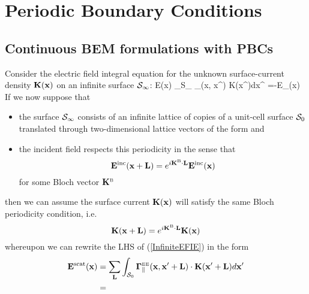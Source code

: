 \documentclass[letterpaper]{article}
\newcommand{\KB}{\vb K\supt{B}}
\begin{document}
\newpage
\section{Periodic Boundary Conditions}

\subsection{Continuous BEM formulations with PBCs}

Consider the electric field integral equation for
the unknown surface-current density $\mathbf{K}(\mathbf{x})$ on 
an infinite surface $\mathcal{S}_\infty$:
{
  \vb E(\vb x)\equiv 
  \int_{\mc S_\infty} 
   \BG_{\parallel}(\vb x, \vb x^\prime) 
   \cdot 
   \vb K(\vb x^\prime)d\vb x^\prime
  =-\vb E_{\parallel}(\vb x)
}
If we now suppose that 
\begin{itemize}
 \item the surface $\mathcal{S}_\infty$ consists of an infinite lattice
       of copies of a unit-cell surface $\mathcal{S}_0$ translated through
       two-dimensional lattice vectors of the form 
       and
 \item the incident field respects this periodicity in the sense that 
       $$ \vb E\sups{inc}(\vb x+\vb L)
          = e^{i\KB \cdot \vb L} \vb E\sups{inc}(\vb x)
       $$
       for some Bloch vector $\KB$
\end{itemize}
then we can assume the surface current $\mathbf{K}(\mathbf{x})$ will satisfy
the same Bloch periodicity condition, i.e.
$$ \vb K(\vb x+\vb L)
   = e^{i\KB \cdot \vb L} \vb K(\vb x)
$$
whereupon we can rewrite the LHS of (\ref{InfiniteEFIE}) in the form
\begin{align}
   \mathbf{E}^{\hbox{\scriptsize{scat}}}(\mathbf{x})
&= \sum_{\mathbf{L}}
   \int_{\mathcal{S}_0}
   \boldsymbol{\Gamma}_{\parallel}^{\hbox{\tiny{EE}}}(\mathbf{x}, \mathbf{x}^\prime+\mathbf{L})
   \cdot 
   \mathbf{K}(\mathbf{x}^\prime + \mathbf{L} )d\mathbf{x}^\prime
\\
&= 
\end{align}
\end{document}
